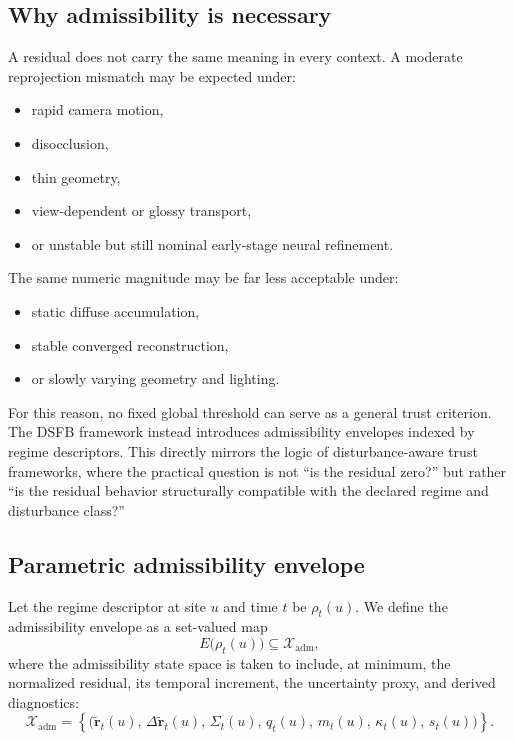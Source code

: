 \documentclass[11pt,letterpaper]{article}
\theoremstyle{gcresult}
\theoremstyle{definition}
\begin{document}

\subsection{Why admissibility is necessary}

A residual does not carry the same meaning in every context. A moderate reprojection mismatch may be expected under:
\begin{itemize}[leftmargin=1.5em]
    \item rapid camera motion,
    \item disocclusion,
    \item thin geometry,
    \item view-dependent or glossy transport,
    \item or unstable but still nominal early-stage neural refinement.
\end{itemize}

The same numeric magnitude may be far less acceptable under:
\begin{itemize}[leftmargin=1.5em]
    \item static diffuse accumulation,
    \item stable converged reconstruction,
    \item or slowly varying geometry and lighting.
\end{itemize}

For this reason, no fixed global threshold can serve as a general trust criterion. The DSFB framework instead introduces admissibility envelopes indexed by regime descriptors. This directly mirrors the logic of disturbance-aware trust frameworks, where the practical question is not “is the residual zero?” but rather “is the residual behavior structurally compatible with the declared regime and disturbance class?” 


\subsection{Parametric admissibility envelope}

Let the regime descriptor at site $u$ and time $t$ be $\rho_t(u)$. We define the admissibility envelope as a set-valued map
\begin{equation}
E\bigl(\rho_t(u)\bigr)
\subseteq
\mathcal X_{\mathrm{adm}},
\end{equation}
where the admissibility state space is taken to include, at minimum, the normalized residual, its temporal increment, the uncertainty proxy, and derived diagnostics:
\begin{equation}
\mathcal X_{\mathrm{adm}}
=
\left\{
\bigl(
\tilde{\mathbf r}_t(u),\,
\Delta \tilde{\mathbf r}_t(u),\,
\Sigma_t(u),\,
q_t(u),\,
m_t(u),\,
\kappa_t(u),\,
s_t(u)
\bigr)
\right\}.
\end{equation}
\end{document}
